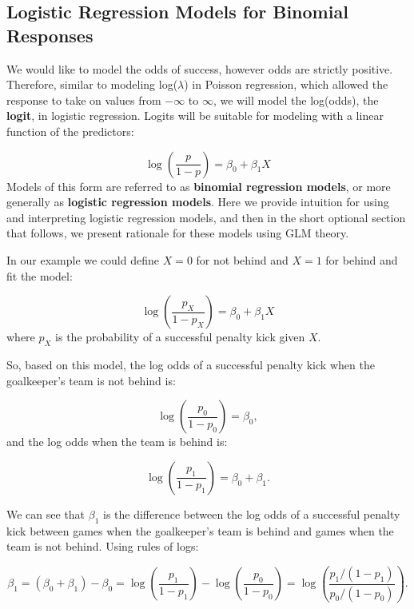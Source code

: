 \documentclass[
]{krantz}
\begin{document}
\hypertarget{logistic-regression-models-for-binomial-responses}{%
\subsection{Logistic Regression Models for Binomial Responses}\label{logistic-regression-models-for-binomial-responses}}

We would like to model the odds of success, however odds are strictly positive. Therefore, similar to modeling log(\(\lambda\)) in Poisson regression, which allowed the response to take on values from \(-\infty\) to \(\infty\), we will model the log(odds), the \textbf{logit},  in logistic regression. Logits will be suitable for modeling with a linear function of the predictors:

\begin{equation*}
\log\left(\frac{p}{1 - p}\right)=\beta_0+\beta_1X 
 \end{equation*}
Models of this form are referred to as \textbf{binomial regression models},  or more generally as \textbf{logistic regression models}.  Here we provide intuition for using and interpreting logistic regression models, and then in the short optional section that follows, we present rationale for these models using GLM theory.

In our example we could define \(X=0\) for not behind and \(X=1\) for behind and fit the model:

\begin{equation}
\log\left(\frac{p_X}{1-p_X}\right)=\beta_0 +\beta_1X
\label{eq:logitXform}
\end{equation}
where \(p_X\) is the probability of a successful penalty kick given \(X\).

So, based on this model, the log odds of a successful penalty kick when the goalkeeper's team is not behind is:

\[
\log\left(\frac{p_0}{1-p_0}\right) =\beta_0 \nonumber,
\]
and the log odds when the team is behind is:

\[
\log\left(\frac{p_1}{1-p_1}\right)=\beta_0+\beta_1. \nonumber
\]

We can see that \(\beta_1\) is the difference between the log odds of a successful penalty kick between games when the goalkeeper's team is behind and games when the team is not behind. Using rules of logs:

\begin{equation*}
\beta_1 = (\beta_0 + \beta_1) - \beta_0 = 
\log\left(\frac{p_1}{1-p_1}\right) - \log\left(\frac{p_0}{1-p_0}\right) =
\log\left(\frac{p_1/(1-p_1)}{p_0/{(1-p_0)}}\right).
\end{equation*}
\end{document}
